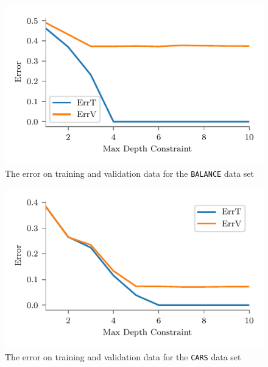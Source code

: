 \documentclass[screen, authorversion, nonacm, sigconf]{acmart}
\begin{document}
\begin{figure}[H]
  \centering
  \includegraphics[width=\columnwidth]{figures/chart_errt_errv_balance_ours.pdf}
  \caption{The error on training and validation data for the \texttt{BALANCE} data set}
  \label{fig:balanceerrterrv}
\end{figure}

\begin{figure}[H]
  \centering
  \includegraphics[width=\columnwidth]{figures/chart_errt_errv_car_ours.pdf}
  \caption{The error on training and validation data for the \texttt{CARS} data set}
  \label{fig:carerrterrv}
\end{figure}
\end{document}
